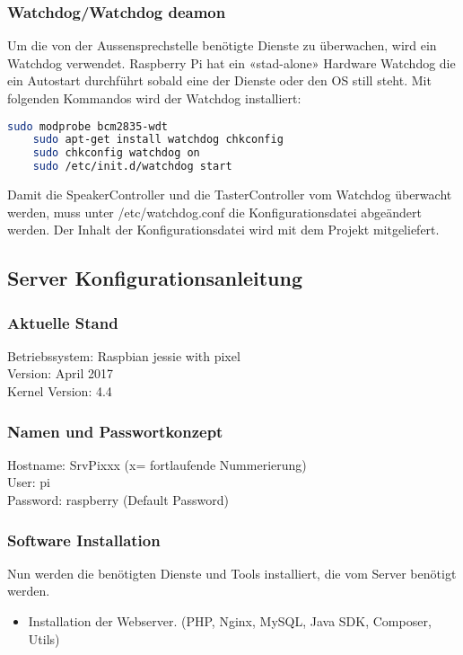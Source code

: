 \subsubsection{Watchdog/Watchdog deamon}
Um die von der Aussensprechstelle benötigte Dienste zu überwachen, wird ein Watchdog verwendet. Raspberry Pi hat ein «stad-alone» Hardware Watchdog die ein Autostart durchführt sobald eine der Dienste oder den OS still steht.
Mit folgenden Kommandos wird der Watchdog installiert:
\\
\begin{lstlisting}[backgroundcolor = \color{snippetcolor},
language = bash,
xleftmargin = 1cm,
framexleftmargin = 0.1em,
breaklines=true]
	sudo modprobe bcm2835-wdt
	sudo apt-get install watchdog chkconfig
	sudo chkconfig watchdog on
	sudo /etc/init.d/watchdog start
\end{lstlisting}
Damit die SpeakerController und die TasterController vom Watchdog überwacht werden, muss unter /etc/watchdog.conf die Konfigurationsdatei abgeändert werden. Der Inhalt der Konfigurationsdatei wird mit dem Projekt mitgeliefert.


\subsection{Server Konfigurationsanleitung}
\subsubsection{Aktuelle Stand}
Betriebssystem:	Raspbian jessie with pixel\\
Version: April 2017\\
Kernel Version: 4.4

\subsubsection{Namen und Passwortkonzept}
Hostname: SrvPixxx (x= fortlaufende Nummerierung)\\
User: pi\\
Password: raspberry (Default Password)\\


\subsubsection{Software Installation}
Nun werden die benötigten Dienste und Tools installiert, die vom Server benötigt werden.

\begin{itemize}
	\item Installation der Webserver. (PHP, Nginx, MySQL, Java SDK, Composer,
	Utils)
\end{itemize}

